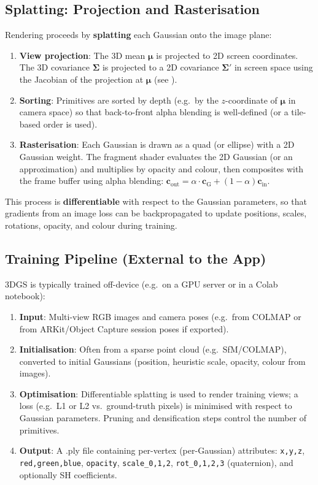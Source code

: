 \subsection{Splatting: Projection and Rasterisation}

Rendering proceeds by \textbf{splatting} each Gaussian onto the image plane:

\begin{enumerate}
    \item \textbf{View projection}: The 3D mean $\boldsymbol{\mu}$ is projected to 2D screen coordinates. The 3D covariance $\boldsymbol{\Sigma}$ is projected to a 2D covariance $\boldsymbol{\Sigma}'$ in screen space using the Jacobian of the projection at $\boldsymbol{\mu}$ (see \cite{kerbl20233dgs}).
    \item \textbf{Sorting}: Primitives are sorted by depth (e.g.\ by the $z$-coordinate of $\boldsymbol{\mu}$ in camera space) so that back-to-front alpha blending is well-defined (or a tile-based order is used).
    \item \textbf{Rasterisation}: Each Gaussian is drawn as a quad (or ellipse) with a 2D Gaussian weight. The fragment shader evaluates the 2D Gaussian (or an approximation) and multiplies by opacity and colour, then composites with the frame buffer using alpha blending: $\mathbf{c}_{\text{out}} = \alpha \cdot \mathbf{c}_{\text{G}} + (1-\alpha) \mathbf{c}_{\text{in}}$.
\end{enumerate}

This process is \textbf{differentiable} with respect to the Gaussian parameters, so that gradients from an image loss can be backpropagated to update positions, scales, rotations, opacity, and colour during training.

\subsection{Training Pipeline (External to the App)}

3DGS is typically trained off-device (e.g.\ on a GPU server or in a Colab notebook):

\begin{enumerate}
    \item \textbf{Input}: Multi-view RGB images and camera poses (e.g.\ from COLMAP or from ARKit/Object Capture session poses if exported).
    \item \textbf{Initialisation}: Often from a sparse point cloud (e.g.\ SfM/COLMAP), converted to initial Gaussians (position, heuristic scale, opacity, colour from images).
    \item \textbf{Optimisation}: Differentiable splatting is used to render training views; a loss (e.g.\ L1 or L2 vs.\ ground-truth pixels) is minimised with respect to Gaussian parameters. Pruning and densification steps control the number of primitives.
    \item \textbf{Output}: A .ply file containing per-vertex (per-Gaussian) attributes: \texttt{x,y,z}, \texttt{red,green,blue}, \texttt{opacity}, \texttt{scale\_0,1,2}, \texttt{rot\_0,1,2,3} (quaternion), and optionally SH coefficients.
\end{enumerate}

